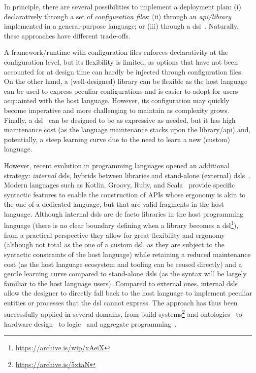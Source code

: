 \documentclass[conference]{IEEEtran}
\begin{document}
In principle, there are several possibilities to implement a deployment plan:
%
(i) declaratively through a set of \emph{configuration files};
(ii) through an \emph{\ac{api}/library} implemented in a general-purpose language;
or 
(iii) through a \ac{dsl}~\cite{dsl-book-voelter}. %
%
Naturally, these approaches have different trade-offs.

A framework/runtime with configuration files enforces declarativity at the configuration level,
but its flexibility is limited,
as options that have not been accounted for at design time can hardly be injected through configuration files.
%
On the other hand,
a (well-designed) library can be flexible as the host language can be used to express peculiar configurations
and is easier to adopt for users acquainted with the host language.
%
However,
its configuration may quickly become imperative and more challenging to maintain as complexity grows.
%
Finally, a \ac{dsl}~\cite{dsl-book-voelter} can be designed to be as expressive as needed,
but it has high maintenance cost
(as the language maintenance stacks upon the library/\ac{api}) and, potentially,
a steep learning curve due to the need to learn a new (custom) language.

However, recent evolution in programming languages opened an additional strategy:
\emph{internal} \acp{dsl},
hybrids between libraries and stand-alone (external) \acp{dsl}~\cite{dsl-book-voelter}.
%
Modern languages such as Kotlin, Groovy, Ruby, and Scala~\cite{Riti2018}
provide specific syntactic features to enable the construction of APIs whose ergonomy is akin to the one of a dedicated language,
but that are valid fragments in the host language.
%
Although internal \acp{dsl} are de facto libraries in the host programming language
(there is no clear boundary defining when a library becomes a \ac{dsl}\footnote{\url{https://archive.is/wip/xAeiX}}),
from a practical perspective
they allow for great flexibility and ergonomy
(although not total as the one of a custom \ac{dsl}, as they are subject to the syntactic constraints of the host language)
while retaining a reduced maintenance cost
(as the host language ecosystem and tooling can be reused directly)
and a gentle learning curve compared to stand-alone \acp{dsl}
(as the syntax will be largely familiar to the host language users).
%
Compared to external ones,
internal \acp{dsl} allow the designer to directly fall back to the host language
to implement peculiar entities or processes that the \ac{dsl} cannot express.
%
The approach has thus been successfully applied in several domains,
from
build systems\footnote{\url{https://archive.is/5xtaN}}
and ontologies~\cite{DBLP:journals/jossw/Balhoff16} to
hardware design~\cite{DBLP:journals/trets/SerreP20} to
logic~\cite{2pkt-swx16} and aggregate programming~\cite{DBLP:journals/softx/CasadeiVAP22}.
%
\end{document}
